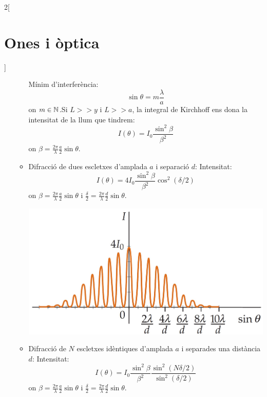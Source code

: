 \documentclass[../../../main.tex]{subfiles}
\begin{document}
\begin{multicols}{2}[\section{Ones i òptica}]
\begin{itemize}
\begin{itemize}
\begin{minipage}{\linewidth}
                  \end{minipage}
                  Mínim d'interferència:
                  $$\sin\theta=m\frac{\lambda}{a}$$ {\footnotesize on $m\in\mathbb{N}$}.\newline Si $L>>y$ i $L>>a$, la integral de Kirchhoff ens dona la intensitat de la llum que tindrem: $$I(\theta)=I_0\frac{\sin^2\beta}{\beta^2}$$ {\footnotesize on $\beta=\frac{2\pi}{\lambda}\frac{a}{2}\sin\theta$.}
            \item Difracció de dues escletxes d'am\-pla\-da $a$ i separació $d$:\newline
                  Intensitat: $$I(\theta)=4I_0\frac{\sin^2\beta}{\beta^2}\cos^2(\delta/2)$$ {\footnotesize on $\beta=\frac{2\pi}{\lambda}\frac{a}{2}\sin\theta$ i $\frac{\delta}{2}=\frac{2\pi}{\lambda}\frac{d}{2}\sin\theta$.}\newline      \begin{minipage}{\linewidth}
                    \includegraphics[width=\linewidth]{Physics/1st/Waves_and_optics/Images/dif2.jpg}
                  \end{minipage}
            \item Difracció de $N$ escletxes i\-dèn\-ti\-ques d'amplada $a$ i separades una distància $d$:\newline
                  Intensitat: $$I(\theta)=I_0\frac{\sin^2\beta}{\beta^2}\frac{\sin^2(N\delta/2)}{\sin^2(\delta/2)}$$ {\footnotesize on $\beta=\frac{2\pi}{\lambda}\frac{a}{2}\sin\theta$ i $\frac{\delta}{2}=\frac{2\pi}{\lambda}\frac{d}{2}\sin\theta$.}\newline

\end{itemize}
\end{itemize}
\end{multicols}
\end{document}

